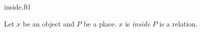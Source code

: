 \documentclass{stex}
\begin{document}
\begin{smodule}{inside.ftl}



\begin{signature*}[forthel,for=inside]
  Let $x$ be an object and $P$ be a place.
  $x$ is \emph{inside $P$} is a relation.
\end{signature*}

\end{smodule}
\end{document}
